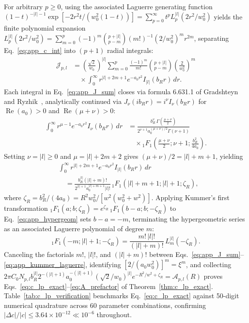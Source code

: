 \documentclass[aps,pra,reprint,nofootinbib,floatfix,longbibliography]{revtex4-2}
\theoremstyle{remark}
\newcommand{\abs}[1]{\lvert #1 \rvert}
\begin{document}
For arbitrary $p \ge 0$, using the associated Laguerre generating function $(1-t)^{-\abs{l}-1}\allowbreak \exp[-2r^2 t/(w_0^2(1-t))] = \sum_{p=0}^\infty t^p L_p^{\abs{l}}(2r^2/w_0^2)$ yields the finite polynomial expansion $L_p^{\abs{l}}(2r^2/w_0^2) = \sum_{m=0}^p (-1)^m \allowbreak \binom{p+\abs{l}}{p-m} \allowbreak (m!)^{-1} \allowbreak (2/w_0^2)^m r^{2m}$, separating Eq.~\eqref{eq:app_c_int} into $(p+1)$ radial integrals:
\begin{align}
\mathcal{J}_{p,l} &= \left(\frac{\sqrt{2}}{w_0}\right)^{\abs{l}} \sum_{m=0}^p \frac{(-1)^m}{m!}\binom{p+\abs{l}}{p-m}\left(\frac{2}{w_0^2}\right)^m \nonumber \\
&\quad \times \int_0^\infty r^{\abs{l}+2m+1} e^{-a_0 r^2} I_{\abs{l}}(b_R r)\,dr.
\label{eq:app_J_sum}
\end{align}
Each integral in Eq.~\eqref{eq:app_J_sum} closes via formula 6.631.1 of Gradshteyn and Ryzhik~\cite{Gradshteyn2014}, analytically continued via $J_\nu(i b_R r) = i^\nu I_\nu(b_R r)$ for $\operatorname{Re}(a_0) > 0$ and $\operatorname{Re}(\mu+\nu) > 0$:
\begin{align*}
\int_0^\infty r^{\mu-1} e^{-a_0 r^2} I_\nu(b_R r)\,dr &= \frac{b_R^\nu\,\Gamma\!\left(\frac{\mu+\nu}{2}\right)}{2^{\nu+1} a_0^{(\mu+\nu)/2}\Gamma(\nu+1)} \\
&\quad \times {_1F_1}\!\left(\frac{\mu+\nu}{2}; \nu+1; \frac{b_R^2}{4a_0}\right).
\end{align*}
Setting $\nu = \abs{l} \ge 0$ and $\mu = \abs{l} + 2m + 2$ gives $(\mu+\nu)/2 = \abs{l} + m + 1$, yielding
\begin{align}
&\int_0^\infty r^{\abs{l}+2m+1} e^{-a_0 r^2} I_{\abs{l}}(b_R r)\,dr \nonumber \\
&\quad = \frac{b_R^{\abs{l}}(\abs{l}+m)!}{2^{\abs{l}+1} a_0^{\abs{l}+m+1}\abs{l}!}\,{_1F_1}\!\left(\abs{l}+m+1; \abs{l}+1; \zeta_R\right),
\label{eq:app_hypergeom}
\end{align}
where $\zeta_R = b_R^2/(4a_0) = R^2 w_0^2/[w^2(w_0^2+w^2)]$. Applying Kummer's first transformation ${_1F_1}(a;b;\zeta_R) = e^{\zeta_R}\,{_1F_1}(b-a;b;-\zeta_R)$ to Eq.~\eqref{eq:app_hypergeom} sets $b - a = -m$, terminating the hypergeometric series as an associated Laguerre polynomial of degree $m$:
\begin{equation}
{_1F_1}\!\left(-m; \abs{l}+1; -\zeta_R\right) = \frac{m!\,\abs{l}!}{(\abs{l}+m)!}\,L_m^{\abs{l}}(-\zeta_R).
\label{eq:app_kummer_laguerre}
\end{equation}
Canceling the factorials $m!$, $\abs{l}!$, and $(\abs{l}+m)!$ between Eqs.~\eqref{eq:app_J_sum}--\eqref{eq:app_kummer_laguerre}, identifying $[2/(a_0 w_0^2)]^m = \xi^m$, and collecting $2\pi C_0 N_{p,l} b_R^{\abs{l}} 2^{-(\abs{l}+1)} a_0^{-(\abs{l}+1)} (\sqrt{2}/w_0)^{\abs{l}} e^{-R^2/w^2 + \zeta_R} = \mathcal{A}_{p,l}(R)$ proves Eqs.~\eqref{eq:c_lp_exact}--\eqref{eq:A_prefactor} of Theorem~\ref{thm:c_lp_exact}. Table~\ref{tab:c_lp_verification} benchmarks Eq.~\eqref{eq:c_lp_exact} against 50-digit numerical quadrature across 60 parameter combinations, confirming $\abs{\Delta c}/\abs{c} \le 3.64\times 10^{-12} \ll 10^{-6}$ throughout.
\end{document}
